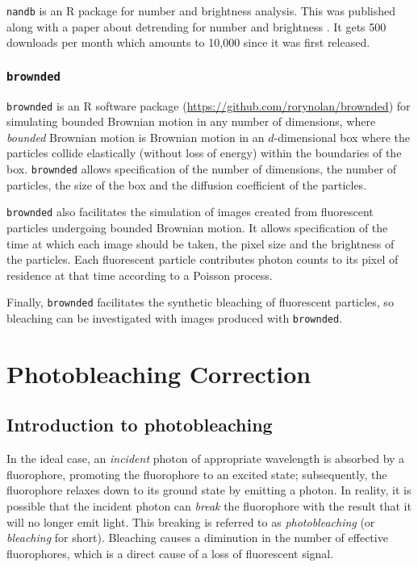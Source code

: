 \documentclass[12pt,]{book}
\theoremstyle{definition}
\theoremstyle{definition}
\theoremstyle{definition}
\theoremstyle{remark}
\begin{document}
\texttt{nandb} is an R package for number and brightness analysis. This
was published along with a paper about detrending for number and
brightness \citep{nandb}. It gets 500 downloads per month which amounts
to 10,000 since it was first released.

\subsection{\texorpdfstring{\texttt{brownded}}{brownded}}\label{brownded}

\texttt{brownded} is an R software package
(\url{https://github.com/rorynolan/brownded}) for simulating bounded
Brownian motion in any number of dimensions, where \emph{bounded}
Brownian motion is Brownian motion in an \(d\)-dimensional box where the
particles collide elastically (without loss of energy) within the
boundaries of the box. \texttt{brownded} allows specification of the
number of dimensions, the number of particles, the size of the box and
the diffusion coefficient of the particles.

\texttt{brownded} also facilitates the simulation of images created from
fluorescent particles undergoing bounded Brownian motion. It allows
specification of the time at which each image should be taken, the pixel
size and the brightness of the particles. Each fluorescent particle
contributes photon counts to its pixel of residence at that time
according to a Poisson process.

Finally, \texttt{brownded} facilitates the synthetic bleaching of
fluorescent particles, so bleaching can be investigated with images
produced with \texttt{brownded}.

\chapter{Photobleaching Correction}\label{photobleaching-correction}

\section{Introduction to
photobleaching}\label{introduction-to-photobleaching}

In the ideal case, an \emph{incident} photon of appropriate wavelength
is absorbed by a fluorophore, promoting the fluorophore to an excited
state; subsequently, the fluorophore relaxes down to its ground state by
emitting a photon. In reality, it is possible that the incident photon
can \emph{break} the fluorophore with the result that it will no longer
emit light. This breaking is referred to as \emph{photobleaching} (or
\emph{bleaching} for short). Bleaching causes a diminution in the number
of effective fluorophores, which is a direct cause of a loss of
fluorescent signal.
\end{document}
